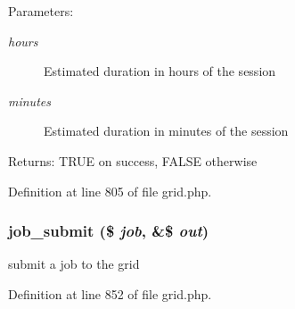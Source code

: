 \begin{Desc}
\item[Parameters:]
\begin{description}
\item[{\em hours}]Estimated duration in hours of the session\item[{\em minutes}]Estimated duration in minutes of the session\end{description}
\end{Desc}
\begin{Desc}
\item[Returns:]TRUE on success, FALSE otherwise \end{Desc}


Definition at line 805 of file grid.php.
\subsubsection{\setlength{\rightskip}{0pt plus 5cm}job\_\-submit (\$ {\em job}, \&\$ {\em out})}\label{grid_8php_a2}


submit a job to the grid 



Definition at line 852 of file grid.php.